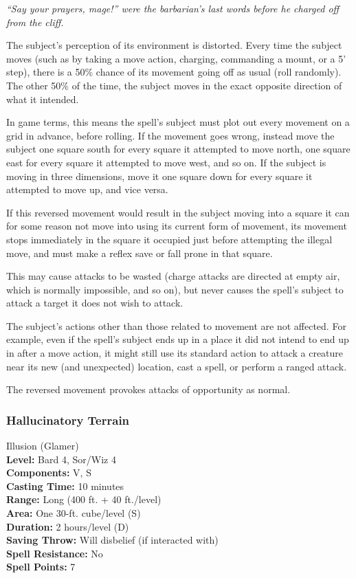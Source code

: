 \emph{``Say your prayers, mage!'' were the barbarian's last words before he charged off from the cliff.}

The subject's perception of its environment is distorted.
Every time the subject moves (such as by taking a move action, charging, commanding a mount, or a 5' step), 
there is a 50\% chance of its movement going off as usual (roll randomly). The other 50\% of the time, the
subject moves in the exact opposite direction of what it intended.

In game terms, this means the spell's subject must plot out every movement on a grid in advance, before rolling.
If the movement goes wrong, instead move the subject one square south for every square it attempted to move north,
one square east for every square it attempted to move west, and so on. If the subject is moving in three dimensions, 
move it one square down for every square it attempted to move up, and vice versa.

If this reversed movement would result in the subject moving into a square it can for some reason not move into using
its current form of movement, its movement stops immediately in the square it occupied just before attempting the illegal move,
and must make a reflex save or fall prone in that square.

This may cause attacks to be wasted (charge attacks are directed at empty air, which is normally impossible, and so on), 
but never causes the spell's subject to attack a target it does not wish to attack.

The subject's actions other than those related to movement are not affected. For example, even if the spell's subject
ends up in a place it did not intend to end up in after a move action, it might still use its standard action to attack a creature
near its new (and unexpected) location, cast a spell, or perform a ranged attack.

The reversed movement provokes attacks of opportunity as normal.


\subsubsection{Hallucinatory Terrain}
\label{Spell:HallucinatoryTerrain}
Illusion (Glamer)
\\ \textbf{Level:} Bard 4, Sor/Wiz 4
\\ \textbf{Components:} V, S
\\ \textbf{Casting Time:} 10 minutes
\\ \textbf{Range:} Long (400 ft. + 40 ft./level)
\\ \textbf{Area:} One 30-ft. cube/level (S)
\\ \textbf{Duration:} 2 hours/level (D)
\\ \textbf{Saving Throw:} Will disbelief (if interacted with)
\\ \textbf{Spell Resistance:} No
\\ \textbf{Spell Points:} 7

